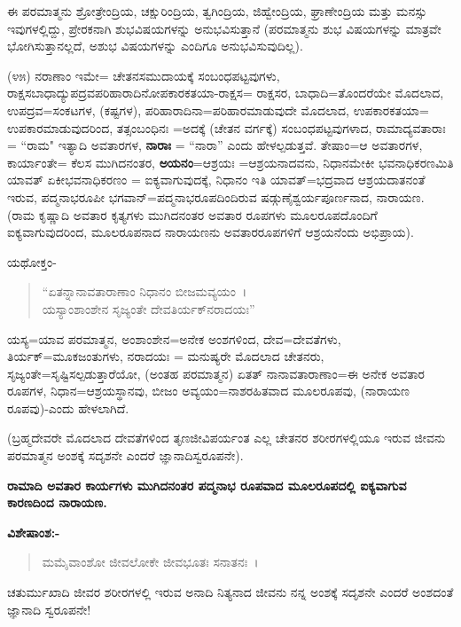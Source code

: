 
ಈ ಪರಮಾತ್ಮನು ಶ್ರೋತ್ರೇಂದ್ರಿಯ, ಚಕ್ಷುರಿಂದ್ರಿಯ, ತ್ವಗಿಂದ್ರಿಯ, ಜಿಹ್ವೇಂದ್ರಿಯ, ಘ್ರಾಣೇಂದ್ರಿಯ ಮತ್ತು ಮನಸ್ಸು ಇವುಗಳಲ್ಲಿದ್ದು, ಪ್ರೇರಕನಾಗಿ ಶುಭವಿಷಯಗಳನ್ನು ಅನುಭವಿಸುತ್ತಾನೆ (ಪರಮಾತ್ಮನು ಶುಭ ವಿಷಯಗಳನ್ನು ಮಾತ್ರವೇ ಭೋಗಿಸುತ್ತಾನಲ್ಲದೆ, ಅಶುಭ ವಿಷಯಗಳನ್ನು ಎಂದಿಗೂ ಅನುಭವಿಸುವುದಿಲ್ಲ).

(೪೫) ನರಾಣಾಂ ಇಮೇ= ಚೇತನಸಮುದಾಯಕ್ಕೆ ಸಂಬಂಧಪಟ್ಟವುಗಳು, ರಾಕ್ಷಸಬಾಧಾದ್ಯುಪದ್ರವಪರಿಹಾರಾದಿನೋಪಕಾರಕತಯಾ-ರಾಕ್ಷಸ= ರಾಕ್ಷಸರ, ಬಾಧಾದಿ=ತೊಂದರೆಯೇ ಮೊದಲಾದ, ಉಪದ್ರವ=ಸಂಕಟಗಳ, (ಕಷ್ಟಗಳ), ಪರಿಹಾರಾದಿನಾ=ಪರಿಹಾರಮಾಡುವುದೇ ಮೊದಲಾದ, ಉಪಕಾರಕತಯಾ= ಉಪಕಾರಮಾಡುವುದರಿಂದ, ತತ್ಸಂಬಂಧಿನಃ =ಅದಕ್ಕೆ (ಚೇತನ ವರ್ಗಕ್ಕೆ) ಸಂಬಂಧಪಟ್ಟವುಗಳಾದ, ರಾಮಾದ್ಯವತಾರಾಃ = ``ರಾಮ" ಇತ್ಯಾದಿ ಅವತಾರಗಳ, \textbf{ನಾರಾಃ} = ``ನಾರಾ'' ಎಂದು ಹೇಳಲ್ಪಡುತ್ತವೆ. ತೇಷಾಂ=ಆ ಅವತಾರಗಳ, ಕಾರ್ಯಾಂತೇ= ಕೆಲಸ ಮುಗಿದನಂತರ, \textbf{ಅಯನಂ}=ಆಶ್ರಯಃ =ಆಶ್ರಯನಾದವನು, ನಿಧಾನಮೇಕೀ ಭವನಾಧಿಕರಣಮಿತಿ ಯಾವತ್‌ ಏಕೀಭವನಾಧಿಕರಣಂ = ಐಕ್ಯವಾಗುವುದಕ್ಕೆ, ನಿಧಾನಂ ಇತಿ ಯಾವತ್=ಭದ್ರವಾದ ಆಶ್ರಯದಾತನಂತೆ ಇರುವ, ಪದ್ಮನಾಭರೂಪೀ ಭಗವಾನ್=ಪದ್ಮನಾಭರೂಪದಿಂದಿರುವ ಷಡ್ಗುಣೈಶ್ವರ್ಯಪೂರ್ಣನಾದ, ನಾರಾಯಣ. (ರಾಮ ಕೃಷ್ಣಾದಿ ಅವತಾರ ಕೃತ್ಯಗಳು ಮುಗಿದನಂತರ ಅವತಾರ ರೂಪಗಳು ಮೂಲರೂಪದೊಂದಿಗೆ ಐಕ್ಯವಾಗುವುದರಿಂದ, ಮೂಲರೂಪನಾದ ನಾರಾಯಣನು ಅವತಾರರೂಪಗಳಿಗೆ ಆಶ್ರಯನೆಂದು ಅಭಿಪ್ರಾಯ).

ಯಥೋಕ್ತಂ-

\begin{verse}
``ಏತನ್ನಾನಾವತಾರಾಣಾಂ ನಿಧಾನಂ ಬೀಜಮವ್ಯಯಂ~।\\ ಯಸ್ಯಾಂಶಾಂಶೇನ ಸೃಜ್ಯಂತೇ ದೇವತಿರ್ಯಕ್‌ನರಾದಯಃ''
\end{verse}

ಯಸ್ಯ=ಯಾವ ಪರಮಾತ್ಮನ, ಅಂಶಾಂಶೇನ=ಅನೇಕ ಅಂಶಗಳಿಂದ, ದೇವ=ದೇವತೆಗಳು, ತಿರ್ಯಕ್=ಮೂಕಜಂತುಗಳು, ನರಾದಯಃ = ಮನುಷ್ಯರೇ ಮೊದಲಾದ ಚೇತನರು, ಸೃಜ್ಯಂತೇ=ಸೃಷ್ಟಿಸಲ್ಪಡುತ್ತಾರೆಯೋ, (ಅಂತಹ ಪರಮಾತ್ಮನ) ಏತತ್ ನಾನಾವತಾರಾಣಾಂ=ಈ ಅನೇಕ ಅವತಾರ ರೂಪಗಳ, ನಿಧಾನ=ಆಶ್ರಯಸ್ಥಾನವು, ಬೀಜಂ ಅವ್ಯಯಂ=ನಾಶರಹಿತವಾದ ಮೂಲರೂಪವು, (ನಾರಾಯಣ ರೂಪವು)-ಎಂದು ಹೇಳಲಾಗಿದೆ.

(ಬ್ರಹ್ಮದೇವರೇ ಮೊದಲಾದ ದೇವತೆಗಳಿಂದ ತೃಣಜೀವಿಪರ್ಯಂತ ಎಲ್ಲ ಚೇತನರ ಶರೀರಗಳಲ್ಲಿಯೂ ಇರುವ ಜೀವನು ಪರಮಾತ್ಮನ ಅಂಶಕ್ಕೆ ಸದೃಶನೇ ಎಂದರೆ ಜ್ಞಾನಾದಿಸ್ವರೂಪನೇ).

\begin{center}
\textbf{ರಾಮಾದಿ ಅವತಾರ ಕಾರ್ಯಗಳು ಮುಗಿದನಂತರ ಪದ್ಮನಾಭ ರೂಪವಾದ ಮೂಲರೂಪದಲ್ಲಿ ಐಕ್ಯವಾಗುವ ಕಾರಣದಿಂದ ನಾರಾಯಣ.}
\end{center}

\noindent
\textbf{ವಿಶೇಷಾಂಶ:-}

\begin{verse}
ಮಮೈವಾಂಶೋ ಜೀವಲೋಕೇ ಜೀವಭೂತಃ ಸನಾತನಃ~।
\end{verse}


ಚತುರ್ಮುಖಾದಿ ಜೀವರ ಶರೀರಗಳಲ್ಲಿ ಇರುವ ಅನಾದಿ ನಿತ್ಯನಾದ ಜೀವನು ನನ್ನ ಅಂಶಕ್ಕೆ ಸದೃಶನೇ ಎಂದರೆ ಅಂಶದಂತೆ ಜ್ಞಾನಾದಿ ಸ್ವರೂಪನೇ!

